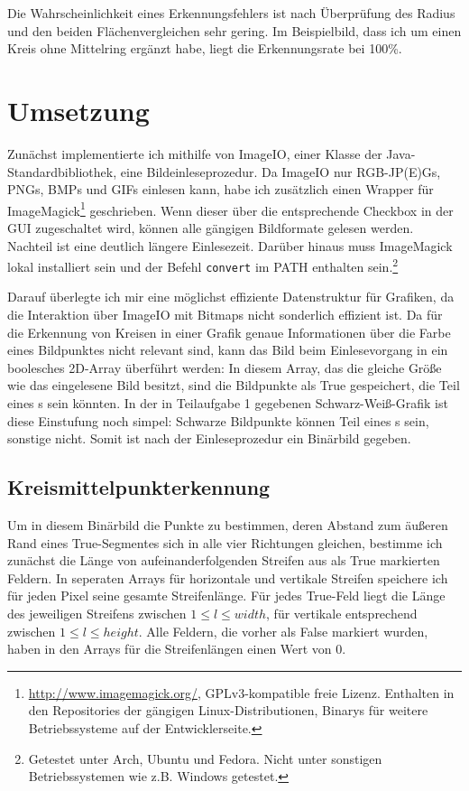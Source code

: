 Die Wahrscheinlichkeit eines Erkennungsfehlers ist nach Überprüfung des Radius und den beiden Flächenvergleichen sehr gering. Im Beispielbild, dass ich um einen Kreis ohne Mittelring ergänzt habe, liegt die Erkennungsrate bei 100\%.

\section{Umsetzung}
Zunächst implementierte ich mithilfe von ImageIO, einer Klasse der Java-Standardbibliothek, eine Bildeinleseprozedur. Da ImageIO nur RGB-JP(E)Gs, PNGs, BMPs und GIFs einlesen kann, habe ich zusätzlich einen Wrapper für ImageMagick\footnote{\url{http://www.imagemagick.org/}, GPLv3-kompatible freie Lizenz. Enthalten in den Repositories der gängigen Linux-Distributionen, Binarys für weitere Betriebssysteme auf der Entwicklerseite.} geschrieben. Wenn dieser über die entsprechende Checkbox in der GUI zugeschaltet wird, können alle gängigen Bildformate gelesen werden. Nachteil ist eine deutlich längere Einlesezeit. Darüber hinaus muss ImageMagick lokal installiert sein und der Befehl \texttt{convert} im PATH enthalten sein.\footnote{Getestet unter Arch, Ubuntu und Fedora. Nicht unter sonstigen Betriebssystemen wie z.B. Windows getestet.} 

Darauf überlegte ich mir eine möglichst effiziente Datenstruktur für Grafiken, da die Interaktion über ImageIO mit Bitmaps nicht sonderlich effizient ist. Da für die Erkennung von Kreisen in einer Grafik genaue Informationen über die Farbe eines Bildpunktes nicht relevant sind, kann das Bild beim Einlesevorgang in ein boolesches 2D-Array überführt werden: In diesem Array, das die gleiche Größe wie das eingelesene Bild besitzt, sind die Bildpunkte als True gespeichert, die Teil eines \task{}s sein könnten. In der in Teilaufgabe 1 gegebenen Schwarz-Weiß-Grafik ist diese Einstufung noch simpel: Schwarze Bildpunkte können Teil eines \task{}s sein, sonstige nicht. Somit ist nach der Einleseprozedur ein Binärbild gegeben.

\subsection{Kreismittelpunkterkennung}
Um in diesem Binärbild die Punkte zu bestimmen, deren Abstand zum äußeren Rand eines True-Segmentes sich in alle vier Richtungen gleichen, bestimme ich zunächst die Länge von aufeinanderfolgenden Streifen aus als True markierten Feldern. In seperaten Arrays für horizontale und vertikale Streifen speichere ich für jeden Pixel seine gesamte Streifenlänge.
Für jedes True-Feld liegt die Länge des jeweiligen Streifens zwischen \(1 \le l \le width\), für vertikale entsprechend zwischen \(1 \le l \le height\). Alle Feldern, die vorher als False markiert wurden, haben in den Arrays für die Streifenlängen einen Wert von 0. 

